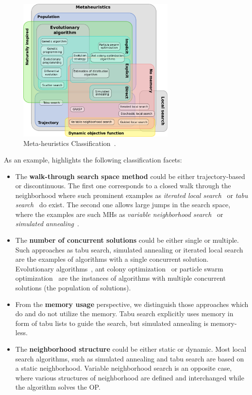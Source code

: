 \begin{figure}
	\centering
	\includegraphics[width=0.7\textwidth]{graphics/Background/Metaheuristics_classification}
	\caption{Meta-heuristics Classification~\cite{dreo2007dreaming}.}
	\label{BG: MH classification}
\end{figure}

As an example, \cite{birattari2001classification} highlights the following classification facets:
\begin{itemize}
	\item The \textbf{walk-through search space method} could be either trajectory-based or discontinuous. The first one corresponds to a closed walk through the neighborhood where such prominent examples as \textit{iterated local search}~\cite{lourencco2003iterated} or \textit{tabu search}~\cite{glover1989tabu} do exist. The second one allows large jumps in the search space, where the examples are such MHs as \textit{variable neighborhood search}~\cite{hansen2003variable} or \textit{simulated annealing}~\cite{kirkpatrick1983optimization}.
	
	\item The \textbf{number of concurrent solutions} could be either single or multiple. Such approaches as tabu search, simulated annealing or iterated local search are the examples of algorithms with a single concurrent solution. Evolutionary algorithms~\cite{eiben2015evolutionary}, ant colony optimization~\cite{dorigo2007ant} or particle swarm optimization~\cite{kennedy1995particle} are the instances of algorithms with multiple concurrent solutions (the population of solutions).
	
	\item From the \textbf{memory usage} perspective, we distinguish those approaches which do and do not utilize the memory. Tabu search explicitly uses memory in form of tabu lists to guide the search, but simulated annealing is memory-less.
	
	\item The \textbf{neighborhood structure} could be either static or dynamic. Most local search algorithms, such as simulated annealing and tabu search are based on a static neighborhood. Variable neighborhood search is an opposite case, where various structures of neighborhood are defined and interchanged while the algorithm solves the OP.
\end{itemize}

